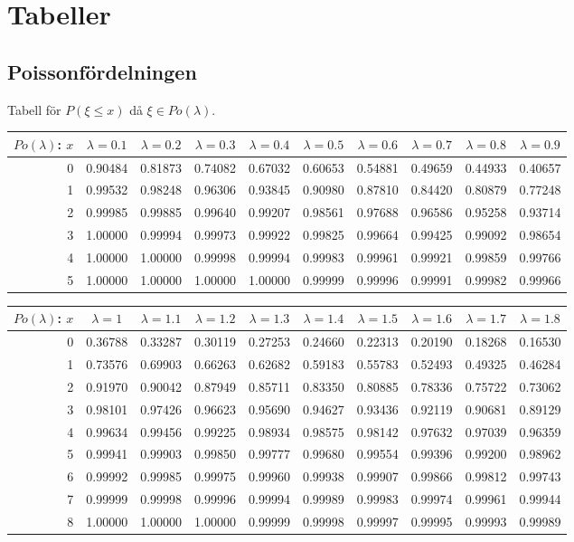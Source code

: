\documentclass{article}
\begin{document}
\section*{Tabeller}%

\small {%

\subsection*{Poissonfördelningen}

Tabell för $P(\xi\le x)$ då $\xi\in Po(\lambda)$.

\medskip\begin{tabular}{|r|c|c|c|c|c|c|c|c|c|}
\hline
$Po(\lambda)$: $x$
   & $\lambda=0.1$ & $\lambda=0.2$ & $\lambda=0.3$ & $\lambda=0.4$ & $\lambda=0.5$ & $\lambda=0.6$ & $\lambda=0.7$ & $\lambda=0.8$ & $\lambda=0.9$ \\\hline
  0&0.90484&0.81873&0.74082&0.67032&0.60653&0.54881&0.49659&0.44933&0.40657\\
  1&0.99532&0.98248&0.96306&0.93845&0.90980&0.87810&0.84420&0.80879&0.77248\\
  2&0.99985&0.99885&0.99640&0.99207&0.98561&0.97688&0.96586&0.95258&0.93714\\
  3&1.00000&0.99994&0.99973&0.99922&0.99825&0.99664&0.99425&0.99092&0.98654\\
  4&1.00000&1.00000&0.99998&0.99994&0.99983&0.99961&0.99921&0.99859&0.99766\\
  5&1.00000&1.00000&1.00000&1.00000&0.99999&0.99996&0.99991&0.99982&0.99966\\
\hline
\end{tabular}

\vspace{8pt minus 6pt}
\begin{tabular}{|r|c|c|c|c|c|c|c|c|c|}
\hline
$Po(\lambda)$: $x$
   & $\lambda=1$ & $\lambda=1.1$ & $\lambda=1.2$ & $\lambda=1.3$ & $\lambda=1.4$ & $\lambda=1.5$ & $\lambda=1.6$ & $\lambda=1.7$ & $\lambda=1.8$ \\\hline
  0&0.36788&0.33287&0.30119&0.27253&0.24660&0.22313&0.20190&0.18268&0.16530\\
  1&0.73576&0.69903&0.66263&0.62682&0.59183&0.55783&0.52493&0.49325&0.46284\\
  2&0.91970&0.90042&0.87949&0.85711&0.83350&0.80885&0.78336&0.75722&0.73062\\
  3&0.98101&0.97426&0.96623&0.95690&0.94627&0.93436&0.92119&0.90681&0.89129\\
  4&0.99634&0.99456&0.99225&0.98934&0.98575&0.98142&0.97632&0.97039&0.96359\\
  5&0.99941&0.99903&0.99850&0.99777&0.99680&0.99554&0.99396&0.99200&0.98962\\
  6&0.99992&0.99985&0.99975&0.99960&0.99938&0.99907&0.99866&0.99812&0.99743\\
  7&0.99999&0.99998&0.99996&0.99994&0.99989&0.99983&0.99974&0.99961&0.99944\\
  8&1.00000&1.00000&1.00000&0.99999&0.99998&0.99997&0.99995&0.99993&0.99989\\
\hline
\end{tabular}

}
\end{document}
